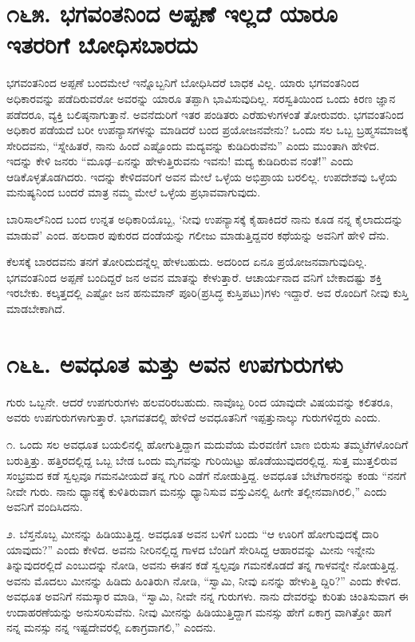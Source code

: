 \section{\num{೧೬೫. } ಭಗವಂತನಿಂದ ಅಪ್ಪಣೆ ಇಲ್ಲದೆ ಯಾರೂ ಇತರರಿಗೆ ಬೋಧಿಸಬಾರದು}

ಭಗವಂತನಿಂದ ಅಪ್ಪಣೆ ಬಂದಮೇಲೆ ಇನ್ನೊಬ್ಬನಿಗೆ ಬೋಧಿಸಿದರೆ ಬಾಧಕ ವಿಲ್ಲ. ಯಾರು ಭಗವಂತನಿಂದ ಅಧಿಕಾರವನ್ನು ಪಡೆದಿರುವರೋ ಅವರನ್ನು ಯಾರೂ ತಪ್ಪಾಗಿ ಭಾವಿಸುವುದಿಲ್ಲ. ಸರಸ್ವತಿಯಿಂದ ಒಂದು ಕಿರಣ ಜ್ಞಾನ ಪಡೆದರೂ, ವ್ಯಕ್ತಿ ಬಲಿಷ್ಠನಾಗುತ್ತಾನೆ. ಅವನೆದುರಿಗೆ ಇತರ ಪಂಡಿತರು ಎರೆಹುಳುಗಳಂತೆ ತೋರುವರು. ಭಗವಂತನಿಂದ ಅಧಿಕಾರ ಪಡೆಯದೆ ಬರೀ ಉಪನ್ಯಾಸಗಳನ್ನು ಮಾಡಿದರೆ ಬಂದ ಪ್ರಯೋಜನವೇನು? ಒಂದು ಸಲ ಒಬ್ಬ ಬ್ರಹ್ಮಸಮಾಜಕ್ಕೆ ಸೇರಿದವನು, “ಸ್ನೇಹಿತರೆ, ನಾನು ಹಿಂದೆ ಎಷ್ಟೊಂದು ಮದ್ಯವನ್ನು ಕುಡಿದಿರುವೆನು” ಎಂದು ಮುಂತಾಗಿ ಹೇಳಿದ. ಇದನ್ನು ಕೇಳಿ ಜನರು “ಮೂಢ–ಏನನ್ನು ಹೇಳುತ್ತಿರುವನು ಇವನು! ಮದ್ಯ ಕುಡಿದಿರುವ ನಂತೆ!” ಎಂದು ಆಡಿಕೊಳ್ಳತೊಡಗಿದರು. ಇದನ್ನು ಕೇಳಿದವರಿಗೆ ಅವನ ಮೇಲೆ ಒಳ್ಳೆಯ ಅಭಿಪ್ರಾಯ ಬರಲಿಲ್ಲ. ಉಪದೇಶವು ಒಳ್ಳೆಯ ಮನುಷ್ಯನಿಂದ ಬಂದರೆ ಮಾತ್ರ ನಮ್ಮ ಮೇಲೆ ಒಳ್ಳೆಯ ಪ್ರಭಾವವಾಗುವುದು.

ಬಾರಿಸಾಲ್​ನಿಂದ ಬಂದ ಉನ್ನತ ಅಧಿಕಾರಿಯೊಬ್ಬ, ‘ನೀವು ಉಪನ್ಯಾಸಕ್ಕೆ ಕೈಹಾಕಿದರೆ ನಾನು ಕೂಡ ನನ್ನ ಕೈಲಾದುದನ್ನು ಮಾಡುವೆ’ ಎಂದ. ಹಲದಾರ ಪುಕುರದ ದಂಡೆಯನ್ನು ಗಲೀಜು ಮಾಡುತ್ತಿದ್ದವರ ಕಥೆಯನ್ನು ಅವನಿಗೆ ಹೇಳಿ ದೆನು.

ಕೆಲಸಕ್ಕೆ ಬಾರದವನು ತನಗೆ ತೋರಿದುದನ್ನೆಲ್ಲ ಹೇಳಬಹುದು. ಅದರಿಂದ ಏನೂ ಪ್ರಯೋಜನವಾಗುವುದಿಲ್ಲ. ಭಗವಂತನಿಂದ ಅಪ್ಪಣೆ ಬಂದಿದ್ದರೆ ಜನ ಅವನ ಮಾತನ್ನು ಕೇಳುತ್ತಾರೆ. ಆಚಾರ್ಯನಾದ ವನಿಗೆ ಬೇಕಾದಷ್ಟು ಶಕ್ತಿ ಇರಬೇಕು. ಕಲ್ಕತ್ತದಲ್ಲಿ ಎಷ್ಟೋ ಜನ ಹನುಮಾನ್ ಪೂರಿ(ಪ್ರಸಿದ್ಧ ಕುಸ್ತಿಪಟು)ಗಳು ಇದ್ದಾರೆ. ಅವ ರೊಂದಿಗೆ ನೀವು ಕುಸ್ತಿ ಮಾಡಬೇಕಾಗಿದೆ.


\section{\num{೧೬೬. } ಅವಧೂತ ಮತ್ತು ಅವನ ಉಪಗುರುಗಳು}

ಗುರು ಒಬ್ಬನೇ. ಆದರೆ ಉಪಗುರುಗಳು ಹಲವರಿರಬಹುದು. ನಾವೊಬ್ಬ ರಿಂದ ಯಾವುದೇ ವಿಷಯವನ್ನು ಕಲಿತರೂ, ಅವರು ಉಪಗುರುಗಳಾಗುತ್ತಾರೆ. ಭಾಗವತದಲ್ಲಿ ಹೇಳಿದೆ ಅವಧೂತನಿಗೆ ಇಪ್ಪತ್ತುನಾಲ್ಕು ಗುರುಗಳಿದ್ದರು ಎಂದು.

೧. ಒಂದು ಸಲ ಅವಧೂತ ಬಯಲಿನಲ್ಲಿ ಹೋಗುತ್ತಿದ್ದಾಗ ಮದುವೆಯ ಮೆರವಣಿಗೆ ಬಾಣ ಬಿರುಸು ತಮ್ಮಟೆಗಳೊಂದಿಗೆ ಬರುತ್ತಿತ್ತು. ಹತ್ತಿರದಲ್ಲಿದ್ದ ಒಬ್ಬ ಬೇಡ ಒಂದು ಮೃಗವನ್ನು ಗುರಿಯಿಟ್ಟು ಹೊಡೆಯುವುದರಲ್ಲಿದ್ದ. ಸುತ್ತ ಮುತ್ತಲಿರುವ ಸಂಭ್ರಮದ ಕಡೆ ಸ್ವಲ್ಪವೂ ಗಮನವೀಯದೆ ತನ್ನ ಗುರಿ ಎಡೆಗೆ ನೋಡುತ್ತಿದ್ದ. ಅವಧೂತ ಬೇಟೆಗಾರನನ್ನು ಕಂಡು “ನನಗೆ ನೀವೇ ಗುರು. ನಾನು ಧ್ಯಾನಕ್ಕೆ ಕುಳಿತಿರುವಾಗ ಮನಸ್ಸು ಧ್ಯಾನಿಸುವ ವಸ್ತುವಿನಲ್ಲಿ ಹೀಗೇ ತಲ್ಲೀನವಾಗಿರಲಿ,” ಎಂದು ಅವನಿಗೆ ವಂದಿಸಿದನು.

೨. ಬೆಸ್ತನೊಬ್ಬ ಮೀನನ್ನು ಹಿಡಿಯುತ್ತಿದ್ದ. ಅವಧೂತ ಅವನ ಬಳಿಗೆ ಬಂದು “ಆ ಊರಿಗೆ ಹೋಗುವುದಕ್ಕೆ ದಾರಿ ಯಾವುದು?” ಎಂದು ಕೇಳಿದ. ಅವನು ನೀರಿನಲ್ಲಿದ್ದ ಗಾಳದ ಬೆಂಡಿಗೆ ಸೇರಿಸಿದ್ದ ಆಹಾರವನ್ನು ಮೀನು ಇನ್ನೇನು ತಿನ್ನುವುದರಲ್ಲಿದೆ ಎಂಬುದನ್ನು ನೋಡಿ, ಅವನು ಈತನ ಕಡೆ ಸ್ವಲ್ಪವೂ ಗಮನಕೊಡದೆ ತನ್ನ ಗಾಳವನ್ನೇ ನೋಡುತ್ತಿದ್ದ. ಅವನು ಮೊದಲು ಮೀನನ್ನು ಹಿಡಿದು ಹಿಂತಿರುಗಿ ನೋಡಿ, “ಸ್ವಾಮಿ, ನೀವು ಏನನ್ನು ಹೇಳುತ್ತಿ ದ್ದಿರಿ?” ಎಂದು ಕೇಳಿದ. ಅವಧೂತ ಅವನಿಗೆ ನಮಸ್ಕಾರ ಮಾಡಿ, “ಸ್ವಾಮಿ, ನೀವೇ ನನ್ನ ಗುರುಗಳು. ನಾನು ದೇವರನ್ನು ಕುರಿತು ಚಿಂತಿಸುವಾಗ ಈ ಉದಾಹರಣೆಯನ್ನು ಅನುಸರಿಸುವೆನು. ನೀವು ಮೀನನ್ನು ಹಿಡಿಯುತ್ತಿದ್ದಾಗ ಮನಸ್ಸು ಹೇಗೆ ಏಕಾಗ್ರ ವಾಗಿತ್ತೋ ಹಾಗೆ ನನ್ನ ಮನಸ್ಸು ನನ್ನ ಇಷ್ಟದೇವರಲ್ಲಿ ಏಕಾಗ್ರವಾಗಲಿ,” ಎಂದನು.

